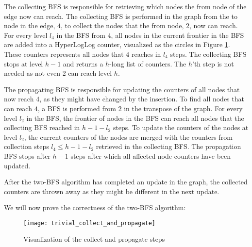 The collecting BFS is responsible for retrieving which nodes the from node of the edge now can reach. The collecting BFS is performed in the graph from the to node in the edge, $4$, to collect the nodes that the from node, $2$, now can reach. For every level $l_4$ in the BFS from $4$, all nodes in the current frontier in the BFS are added into a HyperLogLog counter, visualized as the circles in Figure \ref{fig:collect_and_propagate}. These counters represents all nodes that $4$ reaches in $l_4$ steps. The collecting BFS stops at level $h-1$ and returns a $h$-long list of counters. The $h$'th step is not needed as not even $2$ can reach level $h$.

The propagating BFS is responsible for updating the counters of all nodes that now reach $4$, as they might have changed by the insertion. To find all nodes that can reach $4$, a BFS is performed from $2$ in the transpose of the graph. For every level $l_2$ in the BFS, the frontier of nodes in the BFS can reach all nodes that the collecting BFS reached in $h-1-l_2$ steps. To update the counters of the nodes at level $l_2$, the current counters of the nodes are merged with the counters from collection steps $l_4 \leq h-1-l_2$ retrieved in the collecting BFS. The propagation BFS stops after $h-1$ steps after which all affected node counters have been updated.

After the two-BFS algorithm has completed an update in the graph, the collected counters are thrown away as they might be different in the next update.

We will now prove the correctness of the two-BFS algorithm:

\begin{figure}[h]
\centering
\texttt{[image: trivial\_collect\_and\_propagate]}    
\captionsetup{justification=centering}
\caption {Visualization of the collect and propagate steps}
\label{fig:collect_and_propagate}
\end{figure}


